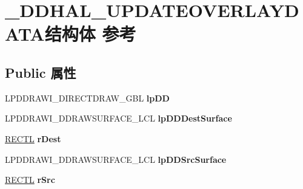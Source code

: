 \hypertarget{struct___d_d_h_a_l___u_p_d_a_t_e_o_v_e_r_l_a_y_d_a_t_a}{}\section{\+\_\+\+D\+D\+H\+A\+L\+\_\+\+U\+P\+D\+A\+T\+E\+O\+V\+E\+R\+L\+A\+Y\+D\+A\+T\+A结构体 参考}
\label{struct___d_d_h_a_l___u_p_d_a_t_e_o_v_e_r_l_a_y_d_a_t_a}
\subsection*{Public 属性}
\begin{DoxyCompactItemize}
\item 
\mbox{\label{struct___d_d_h_a_l___u_p_d_a_t_e_o_v_e_r_l_a_y_d_a_t_a_a176ba2ea7249acb841c823c2fdc8891b}} 
L\+P\+D\+D\+R\+A\+W\+I\+\_\+\+D\+I\+R\+E\+C\+T\+D\+R\+A\+W\+\_\+\+G\+BL {\bfseries lp\+DD}
\item 
\mbox{\label{struct___d_d_h_a_l___u_p_d_a_t_e_o_v_e_r_l_a_y_d_a_t_a_a7b8c725624d416575eae2e531c5a1e02}} 
L\+P\+D\+D\+R\+A\+W\+I\+\_\+\+D\+D\+R\+A\+W\+S\+U\+R\+F\+A\+C\+E\+\_\+\+L\+CL {\bfseries lp\+D\+D\+Dest\+Surface}
\item 
\mbox{\label{struct___d_d_h_a_l___u_p_d_a_t_e_o_v_e_r_l_a_y_d_a_t_a_a6e1ad71026496cdf538c0b30a3653ecf}} 
\hyperlink{struct___r_e_c_t_l}{R\+E\+C\+TL} {\bfseries r\+Dest}
\item 
\mbox{\label{struct___d_d_h_a_l___u_p_d_a_t_e_o_v_e_r_l_a_y_d_a_t_a_af26997a4688d1eb30467111f889e11e1}} 
L\+P\+D\+D\+R\+A\+W\+I\+\_\+\+D\+D\+R\+A\+W\+S\+U\+R\+F\+A\+C\+E\+\_\+\+L\+CL {\bfseries lp\+D\+D\+Src\+Surface}
\item 
\mbox{\label{struct___d_d_h_a_l___u_p_d_a_t_e_o_v_e_r_l_a_y_d_a_t_a_a9acb3fe2b08e49758442b8ddbeebf708}} 
\hyperlink{struct___r_e_c_t_l}{R\+E\+C\+TL} {\bfseries r\+Src}
\item 
\mbox{\label{struct___d_d_h_a_l___u_p_d_a_t_e_o_v_e_r_l_a_y_d_a_t_a_a4f34e0c3dd140d3fdcf79b8f2e7e91b1}} 

\end{DoxyCompactItemize}
